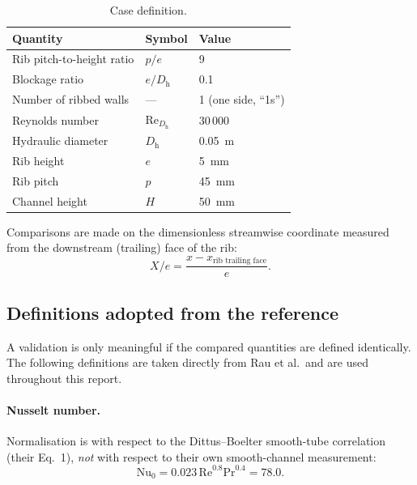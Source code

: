 \documentclass[11pt,a4paper]{article}
\newcommand{\Dh}{D_{\mathrm{h}}}
\newcommand{\Rey}{\mathrm{Re}}
\newcommand{\Prl}{\mathrm{Pr}}
\newcommand{\Nuss}{\mathrm{Nu}}
\begin{document}
\begin{table}[htbp]
\centering
\caption{Case definition.}
\label{tab:case}
\begin{tabular}{lll}
\toprule
Quantity & Symbol & Value \\
\midrule
Rib pitch-to-height ratio & $p/e$        & 9 \\
Blockage ratio            & $e/\Dh$      & 0.1 \\
Number of ribbed walls    & ---          & 1 (one side, ``1s'') \\
Reynolds number           & $\Rey_{\Dh}$ & 30\,000 \\
Hydraulic diameter        & $\Dh$        & \SI{0.05}{\meter} \\
Rib height                & $e$          & \SI{5}{\milli\meter} \\
Rib pitch                 & $p$          & \SI{45}{\milli\meter} \\
Channel height            & $H$          & \SI{50}{\milli\meter} \\
\bottomrule
\end{tabular}
\end{table}

Comparisons are made on the dimensionless streamwise coordinate measured
from the downstream (trailing) face of the rib:
\begin{equation}
  X/e = \frac{x - x_{\text{rib trailing face}}}{e}.
  \label{eq:xe}
\end{equation}

\subsection{Definitions adopted from the reference}
\label{sec:defs}

A validation is only meaningful if the compared quantities are defined
identically. The following definitions are taken directly from
Rau et al.\ and are used throughout this report.

\paragraph{Nusselt number.} Normalisation is with respect to the
Dittus--Boelter smooth-tube correlation (their Eq.~1), \emph{not} with
respect to their own smooth-channel measurement:
\begin{equation}
  \Nuss_{0} = 0.023\,\Rey^{0.8}\Prl^{0.4} = 78.0 .
  \label{eq:nu0}
\end{equation}
\end{document}

